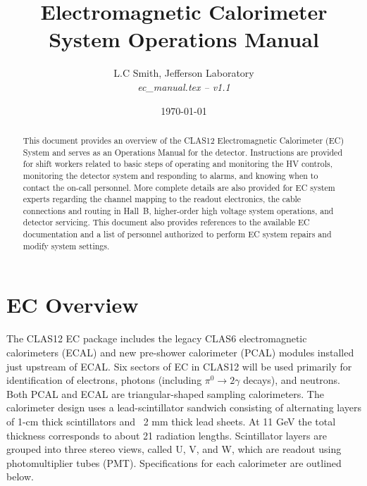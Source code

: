 \documentclass[letterpaper,10pt]{article}
\begin{document}
\title{Electromagnetic Calorimeter System Operations Manual}

\vskip 0.5cm

\author{L.C Smith, Jefferson Laboratory\\[0.2ex]
{\it ec\_manual.tex -- v1.1}}

\date \today
%
\maketitle

\begin{abstract}
This document provides an overview of the CLAS12 Electromagnetic Calorimeter (EC) System and serves 
as an Operations Manual for the detector. Instructions are provided for shift workers related to 
basic steps of operating and monitoring the HV controls, monitoring the detector system and 
responding to alarms, and knowing when to contact the on-call personnel. More complete details 
are also provided for EC system experts regarding the channel mapping to the readout electronics, 
the cable connections and routing in Hall~B, higher-order high voltage system operations, and 
detector servicing. This document also provides references to the available EC documentation and 
a list of personnel authorized to perform EC system repairs and modify system settings.
\end{abstract}

\thispagestyle{empty}

\clearpage

\vfil
\eject

\tableofcontents

\vfil
\eject

\section{EC Overview}
\label{intro}

The CLAS12 EC package includes the legacy CLAS6 electromagnetic calorimeters (ECAL) and new pre-shower calorimeter (PCAL) modules installed just upstream of ECAL.  Six sectors of EC in CLAS12 will be used primarily for identification of electrons, photons (including $\pi^0\rightarrow 2\gamma$ decays), and neutrons.
Both PCAL and ECAL are triangular-shaped sampling calorimeters. The calorimeter design uses a lead-scintillator sandwich consisting of alternating layers of 1-cm thick scintillators and ~2 mm thick lead sheets. At 11 GeV the total thickness corresponds to about 21 radiation lengths. Scintillator layers are grouped into three stereo views, called U, V, and W,  which are readout using photomultiplier tubes (PMT).  Specifications for each calorimeter are outlined below. 
\end{document}
